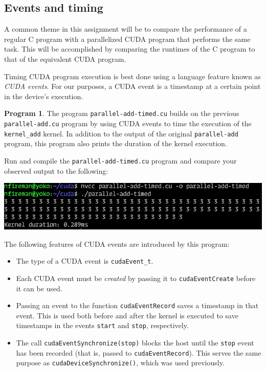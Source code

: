 \documentclass{article}
\theoremstyle{definition}
\newtheorem{program}{Program}
\begin{document}
\subsection{Events and timing}

A common theme in this assignment will be to compare the performance of a regular C program with a parallelized CUDA program that performs the same task. This will be accomplished by comparing the runtimes of the C program to that of the equivalent CUDA program. 

Timing CUDA program execution is best done using a language feature known as \emph{CUDA events}. For our purposes, a CUDA event is a timestamp at a certain point in the device's execution. 

\begin{program}
The program \texttt{parallel-add-timed.cu} builds on the previous \texttt{parallel-add.cu} program by using CUDA events to time the execution of the \texttt{kernel\_add} kernel. In addition to the output of the original \texttt{parallel-add} program, this program also prints the duration of the kernel execution.

Run and compile the \texttt{parallel-add-timed.cu} program and compare your observed output to the following:

\includegraphics[width=\textwidth]{images/parallel-add-timed-output.png}

The following features of CUDA events are introduced by this program:

\begin{itemize}
    \item 
    The type of a CUDA event is \texttt{cudaEvent\_t}.
    
    \item
    Each CUDA event must be \emph{created} by passing it to \texttt{cudaEventCreate} before it can be used.
    
    \item 
    Passing an event to the function \texttt{cudaEventRecord} saves a timestamp in that event. This is used both before and after the kernel is executed to save timestamps in the events \texttt{start} and \texttt{stop}, respectively.
    
    \item
    The call \texttt{cudaEventSynchronize(stop)} blocks the host until the \texttt{stop} event has been recorded (that is, passed to \texttt{cudaEventRecord}). This serves the same purpose as \texttt{cudaDeviceSynchronize()}, which was used previously.
    

\end{itemize}
\end{program}
\end{document}
